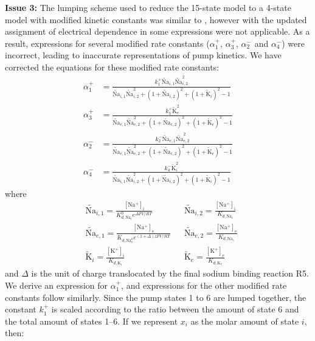 \documentclass[fleqn,10pt]{physiome}
\begin{document}
\textbf{Issue 3:} The lumping scheme used to reduce the 15-state model to a 4-state model with modified kinetic constants was similar to \citet{smith_development_2004}, however with the updated assignment of electrical dependence in \citet{terkildsen_balance_2007} some expressions were not applicable. As a result, expressions for several modified rate constants ($\alpha_1^+$, $\alpha_3^+$, $\alpha_2^-$ and $\alpha_4^-$) were incorrect, leading to inaccurate representations of pump kinetics. We have corrected the equations for these modified rate constants:
\begin{align}
	\alpha_1^+ &= \frac{k_1^+  \tilde{\text{Na}}_{i,1}\tilde{\text{Na}}_{i,2}^2}{\tilde{\text{Na}}_{i,1}\tilde{\text{Na}}_{i,2}^2 + (1 + \tilde{\text{Na}}_{i,2})^2 + (1 + \tilde{\text{K}}_i)^2 -1} \\
	\alpha_3^+ &= \frac{k_3^+ \tilde{\text{K}}_e^{2}}{\tilde{\text{Na}}_{e,1}\tilde{\text{Na}}_{e,2}^2 + (1 + \tilde{\text{Na}}_{e,2})^2 + (1 + \tilde{\text{K}}_e)^2 -1 } \\
	\alpha_2^-&= \frac{k_2^- \tilde{\text{Na}}_{e,1}\tilde{\text{Na}}_{e,2}^2}{\tilde{\text{Na}}_{e,1}\tilde{\text{Na}}_{e,2}^2 + (1 + \tilde{\text{Na}}_{e,2})^2 + (1 + \tilde{\text{K}}_e)^2 -1} \\
	\alpha_4^- &= \frac{k_4^- \tilde{\text{K}}_i^2}{\tilde{\text{Na}}_{i,1}\tilde{\text{Na}}_{i,2}^2 + (1 + \tilde{\text{Na}}_{i,2})^2 + (1 + \tilde{\text{K}}_i)^2 -1}
\end{align}
where
\begin{align}
	&\tilde{\text{Na}}_{i,1} = \frac{\mathrm{[Na^+]_i}}{K_{d,\text{Na}_i}^0 e^{\Delta FV/RT}} 
	&&\tilde{\text{Na}}_{i,2} = \frac{\mathrm{[Na^+]_i}}{K_{d,\text{Na}_i}} \\
	&\tilde{\text{Na}}_{e,1} = \frac{\mathrm{[Na^+]_e}}{K_{d,\text{Na}_e^0} e^{(1+\Delta) zFV/RT}} 
	&&\tilde{\text{Na}}_{e,2} = \frac{\mathrm{[Na^+]_e}}{K_{d,\text{Na}_e}} \\
	&\tilde{\text{K}}_i = \frac{\mathrm{[K^+]_i}}{K_{d,\text{K}_i}} 
	&&\tilde{\text{K}}_e = \frac{\mathrm{[K^+]_e}}{K_{d,\text{K}_e}} 
\end{align}
and $\Delta$ is the unit of charge translocated by the final sodium binding reaction R5. We derive an expression for $\alpha_1^+$, and expressions for the other modified rate constants follow similarly. Since the pump states 1 to 6 are lumped together, the constant $k_1^+$ is scaled according to the ratio between the amount of state 6 and the total amount of states 1--6. If we represent $x_i$ as the molar amount of state $i$, then:
\end{document}
